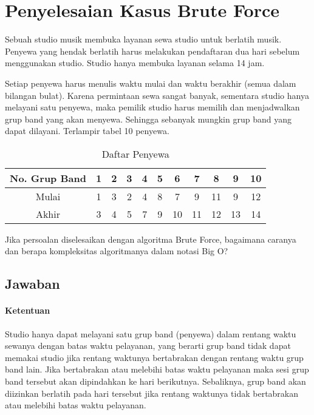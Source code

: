 \documentclass[12pt]{article}
\begin{document}
	\section*{Penyelesaian Kasus Brute Force}
		
	Sebuah studio musik membuka layanan sewa studio untuk berlatih musik. Penyewa yang hendak berlatih
	harus melakukan pendaftaran dua hari sebelum menggunakan studio. Studio hanya membuka layanan
	selama 14 jam.
	
	Setiap penyewa harus menulis waktu mulai dan waktu berakhir (semua dalam bilangan
	bulat). Karena permintaan sewa sangat banyak, sementara studio hanya melayani satu penyewa, maka
	pemilik studio harus memilih dan menjadwalkan grup band yang akan menyewa. Sehingga sebanyak
	mungkin grup band yang dapat dilayani. Terlampir tabel 10 penyewa.

	\begin{table}[h!]
		\caption{Daftar Penyewa}
		\centering
		\begin{tabular}{ |c|c|c|c|c|c|c|c|c|c|c| }
			\hline
			\textbf{No. Grup Band} & \textbf{1} & \textbf{2} & \textbf{3} & \textbf{4} & \textbf{5} & \textbf{6} & \textbf{7} & \textbf{8} & \textbf{9} & \textbf{10} \\
			\hline
			Mulai    & 1 & 3 & 2 & 4 & 8 & 7 & 9 & 11 & 9 & 12 \\
			\hline				
			Akhir	 & 3 & 4 & 5 & 7 & 9 & 10 & 11 & 12 & 13 & 14 \\
			\hline
		\end{tabular}
	\end{table}	
	
	Jika persoalan diselesaikan dengan algoritma Brute Force, bagaimana caranya dan berapa kompleksitas 
	algoritmanya dalam notasi Big O?
	\newpage
	\subsection*{Jawaban}
	
	\paragraph{Ketentuan} \noindent Studio hanya dapat melayani satu grup band (penyewa) dalam
	rentang waktu sewanya dengan batas waktu pelayanan, yang berarti grup band tidak dapat memakai
	studio jika rentang waktunya bertabrakan dengan rentang waktu grup band lain. Jika
	bertabrakan atau melebihi batas waktu pelayanan maka sesi grup band tersebut akan dipindahkan
	ke hari berikutnya. Sebaliknya, grup band akan diizinkan berlatih pada hari	tersebut jika rentang
	waktunya tidak bertabrakan atau melebihi batas waktu pelayanan.
	
\end{document}
